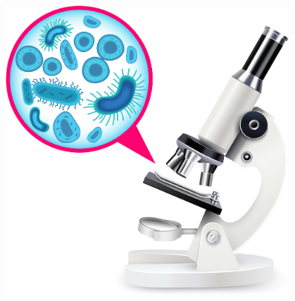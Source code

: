 \begin{frame}
\begin{columns}
        \begin{column}{0.3\textwidth}
            \begin{figure}[!ht]
                \includegraphics[width=0.95\textwidth]{figures/introduction/comprehension.jpg}
            \end{figure}
        \end{column}
    \end{columns}

\end{frame}
